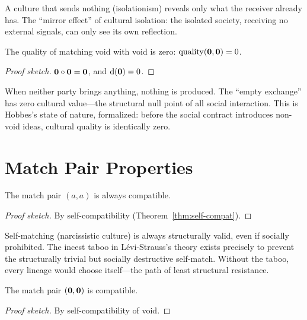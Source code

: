 A culture that sends nothing (isolationism) reveals only what the receiver
already has.  The ``mirror effect'' of cultural isolation: the isolated
society, receiving no external signals, can only see its own reflection.

\begin{theorem}
\label{thm:void-void}
The quality of matching void with void is zero: $\operatorname{quality}(\mathbf{0}, \mathbf{0}) = 0$.
\end{theorem}

\begin{proof}[Proof sketch]
$\mathbf{0} \circ \mathbf{0} = \mathbf{0}$, and $\operatorname{d}(\mathbf{0}) = 0$.
\end{proof}

When neither party brings anything, nothing is produced.  The ``empty
exchange'' has zero cultural value---the structural null point of all social
interaction.  This is Hobbes's state of nature, formalized: before the
social contract introduces non-void ideas, cultural quality is identically
zero.

\section{Match Pair Properties}
\label{sec:ch12-pairs}

\begin{theorem}
\label{thm:self-match}
The match pair $(a, a)$ is always compatible.
\end{theorem}

\begin{proof}[Proof sketch]
By self-compatibility (Theorem~\ref{thm:self-compat}).
\end{proof}

Self-matching (narcissistic culture) is always structurally valid, even if
socially prohibited.  The incest taboo in Lévi-Strauss's theory exists
precisely to prevent the structurally trivial but socially destructive
self-match.  Without the taboo, every lineage would choose itself---the
path of least structural resistance.

\begin{theorem}
\label{thm:void-pair}
The match pair $(\mathbf{0}, \mathbf{0})$ is compatible.
\end{theorem}

\begin{proof}[Proof sketch]
By self-compatibility of void.
\end{proof}

